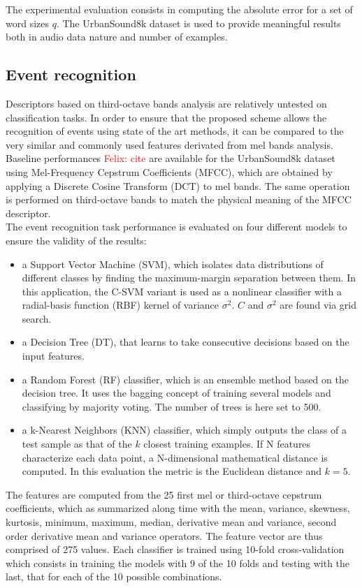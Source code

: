\documentclass[12pt,times,onecolumn]{article}
\newcommand{\fg}[1]{\textcolor{red}{ Felix: #1}}
\begin{document}
The experimental evaluation consists in computing the absolute error for a set of word sizes $q$. The UrbanSound8k dataset is used to provide meaningful results both in audio data nature and number of examples.

\subsection{Event recognition}

Descriptors based on third-octave bands analysis are relatively untested on classification tasks. In order to ensure that the proposed scheme allows the recognition of events using state of the art methods, it can be compared to the very similar and commonly used features derivated from mel bands analysis. Baseline performances \fg{cite} are available for the UrbanSound8k dataset using Mel-Frequency Cepstrum Coefficients (MFCC), which are obtained by applying a Discrete Cosine Transform (DCT) to mel bands. The same operation is performed on third-octave bands to match the physical meaning of the MFCC descriptor.\\

The event recognition task performance is evaluated on four different models to ensure the validity of the results:
\begin{itemize}
\item a Support Vector Machine (SVM), which isolates data distributions of different classes by finding the maximum-margin separation between them. In this application, the C-SVM variant is used as a nonlinear classifier with a radial-basis function (RBF) kernel of variance $\sigma^2$. $C$ and $\sigma^2$ are found via grid search.
\item a Decision Tree (DT), that learns to take consecutive decisions based on the input features.
\item a Random Forest (RF) classifier, which is an ensemble method based on the decision tree. It uses the bagging concept of training several models and classifying by majority voting. The number of trees is here set to 500.
\item a k-Nearest Neighbors (KNN) classifier, which simply outputs the class of a test sample as that of the $k$ closest training examples. If N features characterize each data point, a N-dimensional mathematical distance is computed. In this evaluation the metric is the Euclidean distance and $k = 5$.
\end{itemize}

The features are computed from the 25 first mel or third-octave cepstrum coefficients, which as summarized along time with the mean, variance, skewness, kurtosis, minimum, maximum, median, derivative mean and variance, second order derivative mean and variance operators. The feature vector are thus comprised of 275 values. Each classifier is trained using 10-fold cross-validation which consists in training the models with 9 of the 10 folds and testing with the last, that for each of the 10 possible combinations.\\
\end{document}
